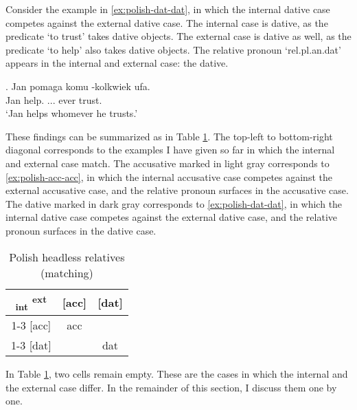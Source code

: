 Consider the example in \ref{ex:polish-dat-dat}, in which the internal dative case competes against the external dative case.
The internal case is dative, as the predicate  `to trust' takes dative objects.
The external case is dative as well, as the predicate  `to help' also takes dative objects.
The relative pronoun  `\ac{rel}.\ac{pl}.\ac{an}.\ac{dat}' appears in the internal and external case: the dative.

\exg. Jan pomaga komu -kolkwiek ufa.\\
 Jan help.\scsub{[dat]} ... ever trust.\scsub{[dat]}\\
 `Jan helps whomever he trusts.' \label{ex:polish-dat-dat}

These findings can be summarized as in Table \ref{tbl:summary-polish-matching}. The top-left to bottom-right diagonal corresponds to the examples I have given so far in which the internal and external case match. The accusative marked in light gray corresponds to \ref{ex:polish-acc-acc}, in which the internal accusative case competes against the external accusative case, and the relative pronoun surfaces in the accusative case. The dative marked in dark gray corresponds to \ref{ex:polish-dat-dat}, in which the internal dative case competes against the external dative case, and the relative pronoun surfaces in the dative case.

\begin{table}[H]
 \center
 \caption{Polish headless relatives (matching)}
 \begin{tabular}{c|c|c}
   \toprule
   \textsubscript{\ac{int}} \textsuperscript{\ac{ext}}
          & [\ac{acc}]
          & [\ac{dat}]
          \\ \cmidrule{1-3}
      [\ac{acc}]
          & \cellcolor{LG}\ac{acc}
          &
          \\ \cmidrule{1-3}
      [\ac{dat}]
          &
          & \cellcolor{DG}\ac{dat}
          \\
    \bottomrule
 \end{tabular}
   \label{tbl:summary-polish-matching}
\end{table}

In Table \ref{tbl:summary-polish-matching}, two cells remain empty. These are the cases in which the internal and the external case differ. In the remainder of this section, I discuss them one by one.

